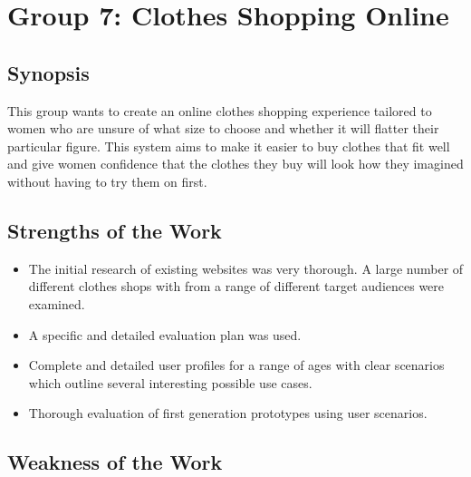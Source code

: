 \section{Group 7: Clothes Shopping Online}

\subsection{Synopsis}

This group wants to create an online clothes shopping experience tailored to
women who are unsure of what size to choose and whether it will flatter their
particular figure. This system aims to make it easier to buy clothes that fit
well and give women confidence that the clothes they buy will look how they
imagined without having to try them on first.

\subsection{Strengths of the Work}

\begin{itemize}

	\item The initial research of existing websites was very thorough. A large
	number of different clothes shops with from a range of different target
	audiences were examined.

	\item A specific and detailed evaluation plan was used.

	\item Complete and detailed user profiles for a range of ages with clear
	scenarios which outline several interesting possible use cases.

	\item Thorough evaluation of first generation prototypes using user
	scenarios.

\end{itemize}

\subsection{Weakness of the Work}

